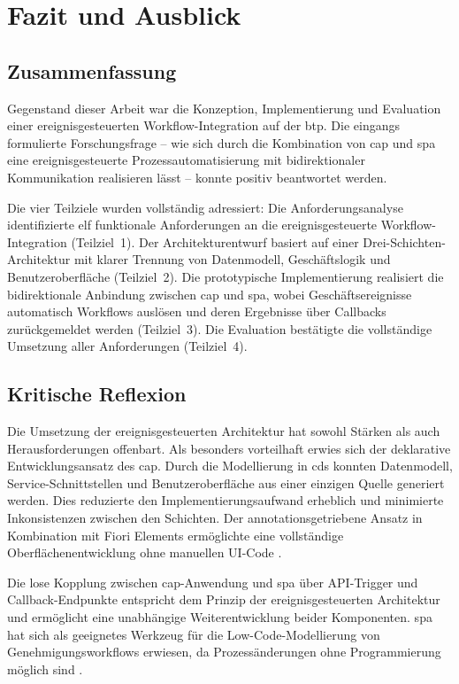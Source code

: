 \section{Fazit und Ausblick}
\label{sec:fazit}

\subsection{Zusammenfassung}

Gegenstand dieser Arbeit war die Konzeption, Implementierung und Evaluation einer ereignisgesteuerten Workflow-Integration auf der \gls{btp}. Die eingangs formulierte Forschungsfrage -- wie sich durch die Kombination von \gls{cap} und \gls{spa} eine ereignisgesteuerte Prozessautomatisierung mit bidirektionaler Kommunikation realisieren lässt -- konnte positiv beantwortet werden.

Die vier Teilziele wurden vollständig adressiert: Die Anforderungsanalyse identifizierte elf funktionale Anforderungen an die ereignisgesteuerte Workflow-Integration (Teilziel~1). Der Architekturentwurf basiert auf einer Drei-Schichten-Architektur mit klarer Trennung von Datenmodell, Geschäftslogik und Benutzeroberfläche (Teilziel~2). Die prototypische Implementierung realisiert die bidirektionale Anbindung zwischen \gls{cap} und \gls{spa}, wobei Geschäftsereignisse automatisch Workflows auslösen und deren Ergebnisse über Callbacks zurückgemeldet werden (Teilziel~3). Die Evaluation bestätigte die vollständige Umsetzung aller Anforderungen (Teilziel~4).

\subsection{Kritische Reflexion}

Die Umsetzung der ereignisgesteuerten Architektur hat sowohl Stärken als auch Herausforderungen offenbart. Als besonders vorteilhaft erwies sich der deklarative Entwicklungsansatz des \gls{cap}. Durch die Modellierung in \gls{cds} konnten Datenmodell, Service-Schnittstellen und Benutzeroberfläche aus einer einzigen Quelle generiert werden. Dies reduzierte den Implementierungsaufwand erheblich und minimierte Inkonsistenzen zwischen den Schichten. Der annotationsgetriebene Ansatz in Kombination mit Fiori Elements ermöglichte eine vollständige Oberflächenentwicklung ohne manuellen UI-Code \citep{sap2024capguide}.

Die lose Kopplung zwischen \gls{cap}-Anwendung und \gls{spa} über API-Trigger und Callback-Endpunkte entspricht dem Prinzip der ereignisgesteuerten Architektur und ermöglicht eine unabhängige Weiterentwicklung beider Komponenten. \gls{spa} hat sich als geeignetes Werkzeug für die Low-Code-Modellierung von Genehmigungsworkflows erwiesen, da Prozessänderungen ohne Programmierung möglich sind \citep{newman2021microservices}.

